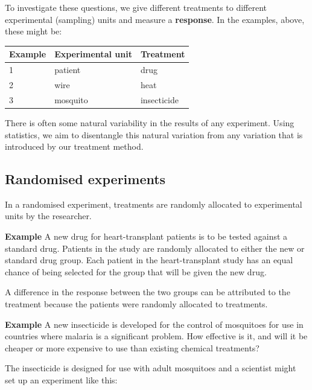 \documentclass[
  oneside]{krantz}
\begin{document}
To investigate these questions, we give different treatments to different experimental (sampling) units and measure a \textbf{response}. In the examples, above, these might be:

\begin{longtable}[]{@{}lll@{}}
\toprule
Example & Experimental unit & Treatment\tabularnewline
\midrule
\endhead
1 & patient & drug\tabularnewline
2 & wire & heat\tabularnewline
3 & mosquito & insecticide\tabularnewline
\bottomrule
\end{longtable}

There is often some natural variability in the results of any experiment. Using statistics, we aim to disentangle this natural variation from any variation that is introduced by our treatment method.

\hypertarget{randomised-experiments}{%
\subsection{Randomised experiments}\label{randomised-experiments}}

In a randomised experiment, treatments are randomly allocated to experimental units by the researcher.

\textbf{Example} A new drug for heart-transplant patients is to be tested against a standard drug. Patients in the study are randomly allocated to either the new or standard drug group. Each patient in the heart-transplant study has an equal chance of being selected for the group that will be given the new drug.

A difference in the response between the two groups can be attributed to the treatment because the patients were randomly allocated to treatments.

\textbf{Example} A new insecticide is developed for the control of mosquitoes for use in countries where malaria is a significant problem. How effective is it, and will it be cheaper or more expensive to use than existing chemical treatments?

The insecticide is designed for use with adult mosquitoes and a scientist might set up an experiment like this:
\end{document}
